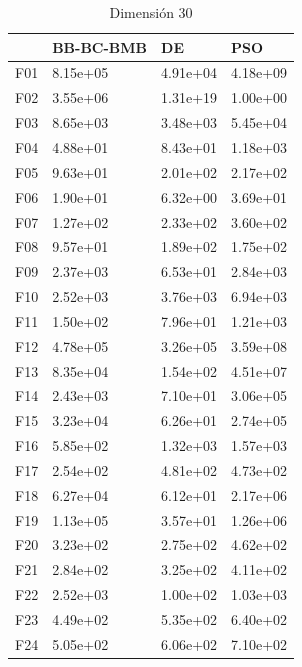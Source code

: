 \begin{table}[H]
\begin{minipage}{.5\linewidth}
    \end{minipage}%
    \begin{minipage}{.5\linewidth}
      \centering
        \caption{Dimensión 30}
        \begin{tabular}{llll}
          \toprule
          {} & BB-BC-BMB &        DE &       PSO \\
          \midrule
          F01  &  8.15e+05 &  4.91e+04 &  4.18e+09 \\
          F02  &  3.55e+06 &  1.31e+19 &  1.00e+00 \\
          F03  &  8.65e+03 &  3.48e+03 &  5.45e+04 \\
          F04  &  4.88e+01 &  8.43e+01 &  1.18e+03 \\
          F05  &  9.63e+01 &  2.01e+02 &  2.17e+02 \\
          F06  &  1.90e+01 &  6.32e+00 &  3.69e+01 \\
          F07  &  1.27e+02 &  2.33e+02 &  3.60e+02 \\
          F08  &  9.57e+01 &  1.89e+02 &  1.75e+02 \\
          F09  &  2.37e+03 &  6.53e+01 &  2.84e+03 \\
          F10  &  2.52e+03 &  3.76e+03 &  6.94e+03 \\
          F11  &  1.50e+02 &  7.96e+01 &  1.21e+03 \\
          F12  &  4.78e+05 &  3.26e+05 &  3.59e+08 \\
          F13  &  8.35e+04 &  1.54e+02 &  4.51e+07 \\
          F14  &  2.43e+03 &  7.10e+01 &  3.06e+05 \\
          F15  &  3.23e+04 &  6.26e+01 &  2.74e+05 \\
          F16  &  5.85e+02 &  1.32e+03 &  1.57e+03 \\
          F17  &  2.54e+02 &  4.81e+02 &  4.73e+02 \\
          F18  &  6.27e+04 &  6.12e+01 &  2.17e+06 \\
          F19  &  1.13e+05 &  3.57e+01 &  1.26e+06 \\
          F20  &  3.23e+02 &  2.75e+02 &  4.62e+02 \\
          F21  &  2.84e+02 &  3.25e+02 &  4.11e+02 \\
          F22  &  2.52e+03 &  1.00e+02 &  1.03e+03 \\
          F23  &  4.49e+02 &  5.35e+02 &  6.40e+02 \\
          F24  &  5.05e+02 &  6.06e+02 &  7.10e+02 \\

\end{tabular}
\end{minipage}
\end{table}
